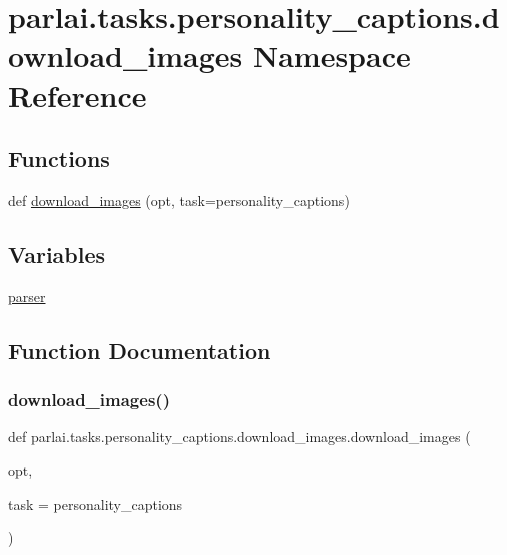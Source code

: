 \hypertarget{namespaceparlai_1_1tasks_1_1personality__captions_1_1download__images}{}\section{parlai.\+tasks.\+personality\+\_\+captions.\+download\+\_\+images Namespace Reference}
\label{namespaceparlai_1_1tasks_1_1personality__captions_1_1download__images}
\subsection*{Functions}
\begin{DoxyCompactItemize}
\item 
def \hyperlink{namespaceparlai_1_1tasks_1_1personality__captions_1_1download__images_a9d812a095ca6d48541b3d5cdc65a4bf3}{download\+\_\+images} (opt, task=\textquotesingle{}personality\+\_\+captions\textquotesingle{})
\end{DoxyCompactItemize}
\subsection*{Variables}
\begin{DoxyCompactItemize}
\item 
\hyperlink{namespaceparlai_1_1tasks_1_1personality__captions_1_1download__images_ad569e6f3e90709b66c27bc16b83e9275}{parser}
\end{DoxyCompactItemize}


\subsection{Function Documentation}
\mbox{\label{namespaceparlai_1_1tasks_1_1personality__captions_1_1download__images_a9d812a095ca6d48541b3d5cdc65a4bf3}} 
\subsubsection{\texorpdfstring{download\+\_\+images()}{download\_images()}}
{\footnotesize\ttfamily def parlai.\+tasks.\+personality\+\_\+captions.\+download\+\_\+images.\+download\+\_\+images (\begin{DoxyParamCaption}\item[{}]{opt,  }\item[{}]{task = {\ttfamily \textquotesingle{}personality\+\_\+captions\textquotesingle{}} }\end{DoxyParamCaption})}



